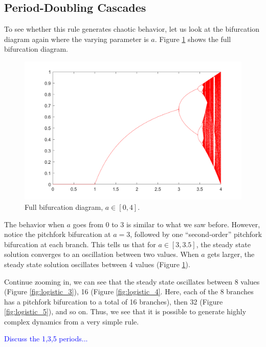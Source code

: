 \documentclass[twocolumn,amsmath,amssymb,aps]{revtex4}
\begin{document}
\subsection{Period-Doubling Cascades}
To see whether this rule generates chaotic behavior, let us look at the bifurcation diagram again where the varying parameter is $a$. Figure \ref{fig:logistic_2} shows the full bifurcation diagram. 
\begin{figure}[!htb]
	\centering
	\includegraphics[scale=0.25]{logistic_2.png}
	\caption{Full bifurcation diagram, $a \in [0,4]$.}
	\label{fig:logistic_2}
\end{figure}


The behavior when $a$ goes from $0$ to $3$ is similar to what we saw before. However, notice the pitchfork bifurcation at $a= 3$, followed by one ``second-order'' pitchfork bifurcation at each branch. This tells us that for $a \in [3,3.5]$, the steady state solution converges to an oscillation between two values. When $a$ gets larger, the steady state solution oscillates between 4 values (Figure \ref{fig:logistic_2}).

Continue zooming in, we can see that the steady state oscillates between 8 values (Figure \ref{fig:logistic_3}), 16 (Figure \ref{fig:logistic_4}. Here, each of the 8 branches has a pitchfork bifurcation to a total of 16 branches), then 32 (Figure \ref{fig:logistic_5}), and so on. Thus, we see that it is possible to generate highly complex dynamics from a very simple rule.

\textcolor{blue}{Discuss the 1,3,5 periods...}
\end{document}
